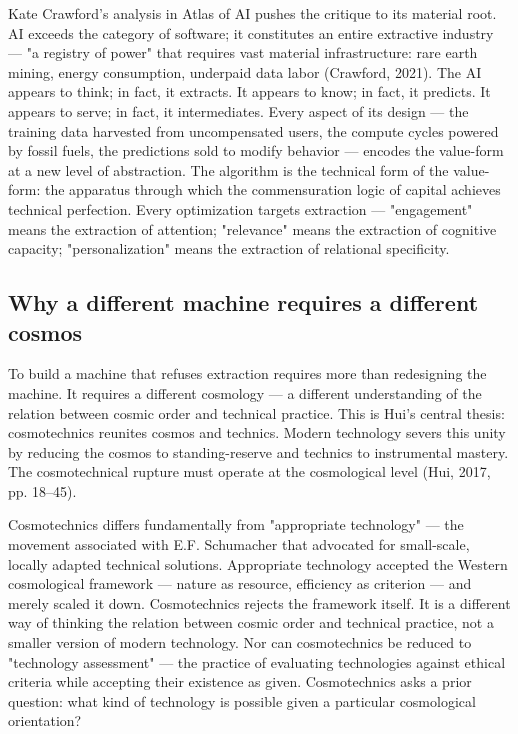 Kate Crawford's analysis in Atlas of AI pushes the critique to its material root. AI exceeds the category of software; it constitutes an entire extractive industry — "a registry of power" that requires vast material infrastructure: rare earth mining, energy consumption, underpaid data labor (Crawford, 2021). The AI appears to think; in fact, it extracts. It appears to know; in fact, it predicts. It appears to serve; in fact, it intermediates. Every aspect of its design — the training data harvested from uncompensated users, the compute cycles powered by fossil fuels, the predictions sold to modify behavior — encodes the value-form at a new level of abstraction. The algorithm is the technical form of the value-form: the apparatus through which the commensuration logic of capital achieves technical perfection. Every optimization targets extraction — "engagement" means the extraction of attention; "relevance" means the extraction of cognitive capacity; "personalization" means the extraction of relational specificity.

\subsection{Why a different machine requires a different cosmos}

To build a machine that refuses extraction requires more than redesigning the machine. It requires a different cosmology — a different understanding of the relation between cosmic order and technical practice. This is Hui's central thesis: cosmotechnics reunites cosmos and technics. Modern technology severs this unity by reducing the cosmos to standing-reserve and technics to instrumental mastery. The cosmotechnical rupture must operate at the cosmological level (Hui, 2017, pp. 18–45).

Cosmotechnics differs fundamentally from "appropriate technology" — the movement associated with E.F. Schumacher that advocated for small-scale, locally adapted technical solutions. Appropriate technology accepted the Western cosmological framework — nature as resource, efficiency as criterion — and merely scaled it down. Cosmotechnics rejects the framework itself. It is a different way of thinking the relation between cosmic order and technical practice, not a smaller version of modern technology. Nor can cosmotechnics be reduced to "technology assessment" — the practice of evaluating technologies against ethical criteria while accepting their existence as given. Cosmotechnics asks a prior question: what kind of technology is possible given a particular cosmological orientation?

